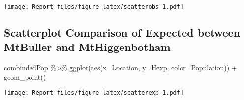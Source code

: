 \documentclass[
]{article}
\newenvironment{Shaded}{\begin{snugshade}}{\end{snugshade}}
\newcommand{\AttributeTok}[1]{\textcolor[rgb]{0.77,0.63,0.00}{#1}}
\newcommand{\DecValTok}[1]{\textcolor[rgb]{0.00,0.00,0.81}{#1}}
\newcommand{\FunctionTok}[1]{\textcolor[rgb]{0.00,0.00,0.00}{#1}}
\newcommand{\NormalTok}[1]{#1}
\newcommand{\OtherTok}[1]{\textcolor[rgb]{0.56,0.35,0.01}{#1}}
\newcommand{\SpecialCharTok}[1]{\textcolor[rgb]{0.00,0.00,0.00}{#1}}
\newcommand{\StringTok}[1]{\textcolor[rgb]{0.31,0.60,0.02}{#1}}
\begin{document}
\begin{Shaded}
\end{Shaded}

\texttt{[image: Report\_files/figure-latex/scatterobs-1.pdf]}

\hypertarget{scatterplot-comparison-of-expected-between-mtbuller-and-mthiggenbotham}{%
\subsection{Scatterplot Comparison of Expected between MtBuller and
MtHiggenbotham}\label{scatterplot-comparison-of-expected-between-mtbuller-and-mthiggenbotham}}

\begin{Shaded}
\begin{Highlighting}[]
\NormalTok{combindedPop }\SpecialCharTok{\%\textgreater{}\%} 
  \FunctionTok{ggplot}\NormalTok{(}\FunctionTok{aes}\NormalTok{(}\AttributeTok{x=}\NormalTok{Location, }\AttributeTok{y=}\NormalTok{Hexp, }\AttributeTok{color=}\NormalTok{Population)) }\SpecialCharTok{+} \FunctionTok{geom\_point}\NormalTok{()}
\end{Highlighting}
\end{Shaded}

\texttt{[image: Report\_files/figure-latex/scatterexp-1.pdf]}
\end{document}
